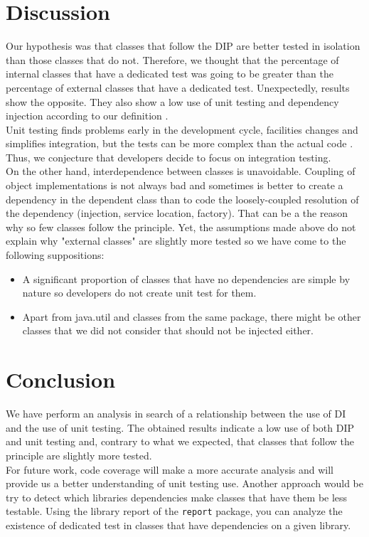 \documentclass[11pt, a4paper, twocolumn]{article}
\begin{document}
\section{Discussion}
Our hypothesis was that classes that follow the DIP are better tested in isolation than those classes that do not. Therefore, we thought that the percentage of internal classes that have a dedicated test was going to be greater than the percentage of external classes that have a dedicated test. Unexpectedly, results show the opposite. They also show a low use of unit testing and dependency injection according to our definition .\\
Unit testing finds problems early in the development cycle, facilities changes and simplifies integration, but the tests can be more complex than the actual code \cite{waste}. Thus, we conjecture that developers decide to focus on integration testing. \\
On the other hand, interdependence between classes is unavoidable. Coupling of object implementations is not always bad and sometimes is better to create a dependency in the dependent class than to code the loosely-coupled resolution of the dependency (injection, service location, factory). That can be a the reason why so few classes follow the principle.
Yet, the assumptions made above do not explain why "external classes" are slightly more tested so we have come to the following suppositions:
\begin{itemize}
\item A significant proportion of classes that have no dependencies are simple by nature so developers do not create unit test for them.
\item Apart from java.util and classes from the same package, there might be other classes that we did not consider that should not be injected either.
\end{itemize}


\section{Conclusion} \label{conclusion}
We have perform an analysis in search of a relationship between the use of DI and the use of unit testing. The obtained results indicate a low use of both DIP and unit testing and, contrary to what we expected, that classes that follow the principle are slightly more tested.\\
For future work, code coverage will make a more accurate analysis and will provide us a better understanding of unit testing use. Another approach would be try to detect which libraries dependencies make classes that have them be less testable. Using the library report of the \texttt{report} package, you can analyze the existence of dedicated test in classes that have dependencies on a given library.
\end{document}
